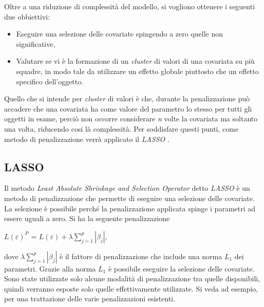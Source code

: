 Oltre a una riduzione di complessità del modello, si vogliono ottenere i seguenti due obbiettivi:
\begin{itemize}
	\item Eseguire una selezione delle covariate spingendo a zero quelle non significative,
	\item Valutare se vi è la formazione di un \emph{cluster} di valori di una covariata su più squadre, in modo tale da utilizzare un effetto globale piuttosto che un effetto specifico dell'oggetto. 
\end{itemize}
Quello che si intende per \emph{cluster} di valori è che, durante la penalizzazione può accadere che una covariata ha come valore del parametro lo stesso per tutti gli oggetti in esame, perciò non occorre considerare \emph{n} volte la covariata ma soltanto una volta, riducendo cosi là complessità.
Per soddisfare questi punti, come metodo di penalizzazione verrà applicato il \emph{LASSO} \autocite{tibshirani1996regression}.\\
\subsection{LASSO}
Il metodo \emph{Least Absolute Shrinkage and Selection Operator} detto \emph{LASSO} \autocite{tibshirani1996regression} è un metodo di penalizzazione che permette di eseguire una selezione delle covariate. La selezione è possibile perché la penalizzazione applicata spinge i parametri ad essere uguali a zero. Si ha la seguente penalizzazione

\begin{center}
$L(\varepsilon)^{P}$ = $L(\varepsilon) + \lambda\sum_{j=1}^{p}|\beta_{j}|$,
\end{center}

dove  $\lambda\sum_{j=1}^{p}|\beta_{j}|$ è il fattore di penalizzazione che include una norma $L_1$ dei parametri. Grazie alla norma $L_1$ è possibile eseguire la selezione delle covariate.\\
Sono state utilizzate solo alcune modalità di penalizzazione tra quelle disponibili, quindi verranno esposte solo quelle effettivamente utilizzate. Si veda ad esempio, \textcite{schauberger2019btllasso} per una trattazione delle varie penalizzazioni esistenti.\\


